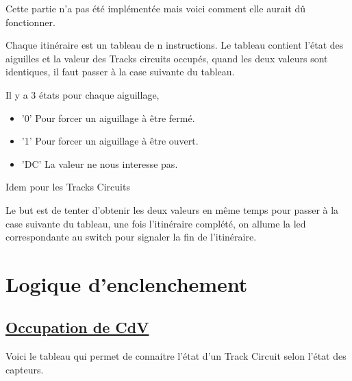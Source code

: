 Cette partie n'a pas été implémentée mais voici comment elle aurait dû
fonctionner.

Chaque itinéraire est un tableau de n instructions.
Le tableau contient l’état des aiguilles et la valeur des Tracks
circuits  occupés, quand les deux  valeurs sont identiques, il faut
passer  à la case suivante du  tableau.

Il y a 3 états pour chaque aiguillage,
\begin{itemize}
  \item '0' Pour forcer un aiguillage à être fermé.
  \item '1' Pour forcer un aiguillage à être ouvert.
  \item 'DC' La valeur ne nous interesse pas.    
\end{itemize}  

Idem pour les Tracks Circuits

Le but est de tenter d’obtenir les deux valeurs en même temps pour
passer à la case suivante du tableau, une fois l’itinéraire complété,
on  allume la led correspondante au switch pour signaler la fin de
l’itinéraire. 



\section{Logique d'enclenchement}
\label{sec:logic}
\subsection{\underline{Occupation de CdV}}
\label{sec:cdv_occ}

Voici le tableau qui permet de connaitre l'état d'un Track Circuit
selon l'état des capteurs.

